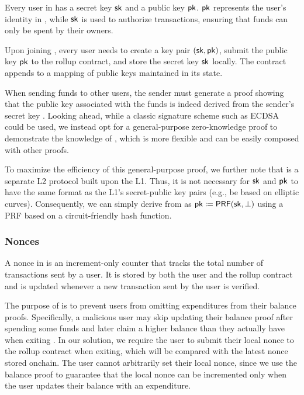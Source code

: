 Every user in \Protocol has a secret key ${\mathsf{sk}}$ and a public key ${\mathsf{pk}}$.
${\mathsf{pk}}$ represents the user's identity in \Protocol, while ${\mathsf{sk}}$ is used to authorize transactions, ensuring that funds can only be spent by their owners.

Upon joining \Protocol, every user needs to create a key pair $({\mathsf{sk}}, {\mathsf{pk}})$, submit the public key ${\mathsf{pk}}$ to the rollup contract, and store the secret key ${\mathsf{sk}}$ locally.
The contract appends \Pk to a mapping of public keys maintained in its state.

When sending funds to other users, the sender must generate a proof showing that the public key \Pk associated with the funds is indeed derived from the sender's secret key \Sk.
Looking ahead, while a classic signature scheme such as ECDSA could be used, we instead opt for a general-purpose zero-knowledge proof to demonstrate the knowledge of \Sk, which is more flexible and can be easily composed with other proofs.

To maximize the efficiency of this general-purpose proof, we further note that \Protocol is a separate \ac{L2} protocol built upon the \ac{L1}.
Thus, it is not necessary for ${\mathsf{sk}}$ and ${\mathsf{pk}}$ to have the same format as the \ac{L1}'s secret-public key pairs (e.g., be based on elliptic curves).
Consequently, we can simply derive \Pk from \Sk as ${\mathsf{pk}} \coloneqq \mathsf{PRF}({\mathsf{sk}}, \bot)$ using a PRF based on a circuit-friendly hash function.

\subsubsection{Nonces}

A nonce \Nonce in \Protocol is an increment-only counter that tracks the total number of transactions sent by a user.
It is stored by both the user and the rollup contract and is updated whenever a new transaction sent by the user is verified.

The purpose of \Nonce is to prevent users from omitting expenditures from their balance proofs.
Specifically, a malicious user may skip updating their balance proof after spending some funds and later claim a higher balance than they actually have when exiting \Protocol.
In our solution, we require the user to submit their local nonce to the rollup contract when exiting, which will be compared with the latest nonce stored onchain.
The user cannot arbitrarily set their local nonce, since we use the balance proof to guarantee that the local nonce can be incremented only when the user updates their balance with an expenditure.

